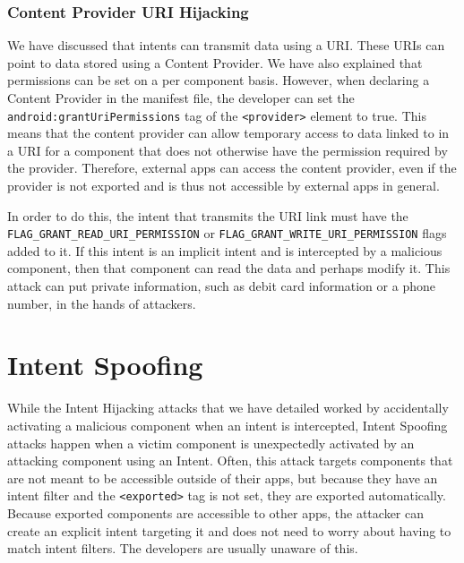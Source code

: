     \subsubsection{Content Provider URI Hijacking}
        \label{subsubsec:provider_uri_hijacking}
        
    We have discussed that intents can transmit data using a URI. These URIs can point to data stored using a Content Provider. We have also explained that permissions can be set on a per component basis. However, when declaring a Content Provider in the manifest file, the developer can set the \lstinline|android:grantUriPermissions| tag of the \lstinline|<provider>| element to true. This means that the content provider can allow temporary access to data linked to in a URI for a component that does not otherwise have the permission required by the provider. Therefore, external apps can access the content provider, even if the provider is not exported and is thus not accessible by external apps in general.
    
    In order to do this, the intent that transmits the URI link must have the \lstinline|FLAG_GRANT_READ_URI_PERMISSION| or \lstinline|FLAG_GRANT_WRITE_URI_PERMISSION| flags added to it. If this intent is an implicit intent and is intercepted by a malicious component, then that component can read the data and perhaps modify it. This attack can put private information, such as debit card information or a phone number, in the hands of attackers.
    
    \section{Intent Spoofing}
        \label{sec:intent_spoofing}
        
    While the Intent Hijacking attacks that we have detailed worked by accidentally activating a malicious component when an intent is intercepted, Intent Spoofing attacks happen when a victim component is unexpectedly activated by an attacking component using an Intent. Often, this attack targets components that are not meant to be accessible outside of their apps, but because they have an intent filter and the \lstinline|<exported>| tag is not set, they are exported automatically. Because exported components are accessible to other apps, the attacker can create an explicit intent targeting it and does not need to worry about having to match intent filters. The developers are usually unaware of this.
    
